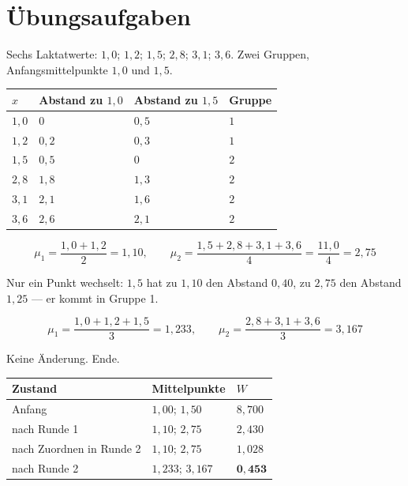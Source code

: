 \section{Übungsaufgaben}

\begin{aufgabe}
Sechs Laktatwerte: $1{,}0$; $1{,}2$; $1{,}5$; $2{,}8$; $3{,}1$; $3{,}6$. Zwei Gruppen, Anfangsmittelpunkte $1{,}0$ und $1{,}5$.

\loesung
{}
\begin{center}
{\small
\renewcommand{\arraystretch}{1.46}
\begin{tabular}{@{}P{1.4cm}P{2.2cm}P{2.2cm}P{1.4cm}@{}}
\toprule
$x$ & \textbf{Abstand zu $1{,}0$} & \textbf{Abstand zu $1{,}5$} & \textbf{Gruppe}\\
\midrule
$1{,}0$ & $0$ & $0{,}5$ & $1$\\
$1{,}2$ & $0{,}2$ & $0{,}3$ & $1$\\
$1{,}5$ & $0{,}5$ & $0$ & $2$\\
$2{,}8$ & $1{,}8$ & $1{,}3$ & $2$\\
$3{,}1$ & $2{,}1$ & $1{,}6$ & $2$\\
$3{,}6$ & $2{,}6$ & $2{,}1$ & $2$\\
\bottomrule
\end{tabular}}
\end{center}

\[ \mu_1 = \frac{1{,}0+1{,}2}{2} = 1{,}10, \qquad \mu_2 = \frac{1{,}5+2{,}8+3{,}1+3{,}6}{4} = \frac{11{,}0}{4} = 2{,}75 \]

Nur ein Punkt wechselt: $1{,}5$ hat zu $1{,}10$ den Abstand $0{,}40$, zu $2{,}75$ den Abstand $1{,}25$ --- er kommt in Gruppe 1.

\[ \mu_1 = \frac{1{,}0+1{,}2+1{,}5}{3} = 1{,}233, \qquad \mu_2 = \frac{2{,}8+3{,}1+3{,}6}{3} = 3{,}167 \]

Keine Änderung. Ende.

\begin{center}
{\small
\renewcommand{\arraystretch}{1.46}
\begin{tabular}{@{}P{3.4cm}P{2.2cm}P{1.6cm}@{}}
\toprule
\textbf{Zustand} & \textbf{Mittelpunkte} & $W$\\
\midrule
Anfang & $1{,}00$; $1{,}50$ & $8{,}700$\\
nach Runde 1 & $1{,}10$; $2{,}75$ & $2{,}430$\\
nach Zuordnen in Runde 2 & $1{,}10$; $2{,}75$ & $1{,}028$\\
nach Runde 2 & $1{,}233$; $3{,}167$ & $\mathbf{0{,}453}$\\
\bottomrule
\end{tabular}}
\end{center}


\end{aufgabe}
